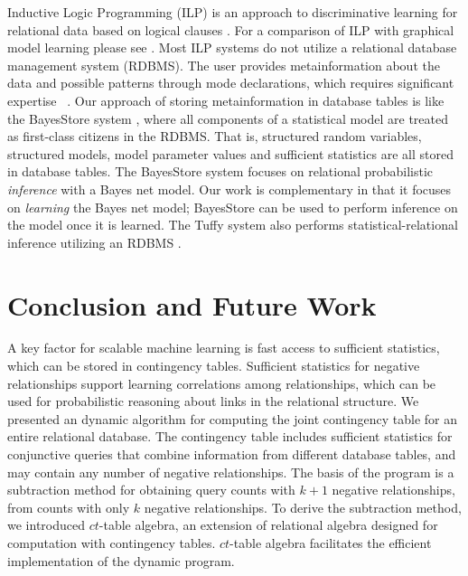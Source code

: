 \documentclass{vldb}
\newcommand{\ct}{\mathit{ct}}
\begin{document}
Inductive Logic Programming (ILP) is an approach to discriminative learning for relational data based on logical clauses \cite{Lavravc1994}. For a comparison of ILP with graphical model learning please see \cite{Domingos2007,Khosravi2012a}. Most ILP systems do not utilize a relational database management system (RDBMS). The user provides metainformation about the data and possible patterns through mode declarations, which requires significant expertise ~\cite{Walker2010}. Our approach of storing metainformation in database tables is like the BayesStore system \cite{Wang2008}, where all components of a statistical model are treated as first-class citizens in the RDBMS. That is, structured random variables, structured models, model parameter values and sufficient statistics are all stored in database tables. The BayesStore system focuses on relational probabilistic {\em inference} with a Bayes net model. Our work is complementary in that it focuses on {\em learning} the Bayes net model; BayesStore can be  used to perform inference on the model once it is learned. The Tuffy system also performs statistical-relational inference utilizing an RDBMS \cite{DBLP:journals/pvldb/NiuRDS11}. 




\section{Conclusion and Future Work} 
A key factor for scalable machine learning is fast access to sufficient statistics, which can be stored in contingency tables. 
Sufficient statistics for negative relationships support learning correlations among relationships, which can be used for probabilistic reasoning about links in the relational structure. 
We presented an dynamic algorithm for computing the joint contingency table for an entire relational database. 
The contingency table includes sufficient statistics for conjunctive queries that combine information from different database tables, and may contain any number of negative relationships. 
The basis of the program is a subtraction method for obtaining query counts with $k+1$ negative relationships, from counts with only $k$ negative relationships. 
To derive the subtraction method, we introduced $\ct$-table algebra, an extension of relational algebra designed for computation with contingency tables. 
$\ct$-table algebra facilitates the efficient implementation of the dynamic program. 
\end{document}
